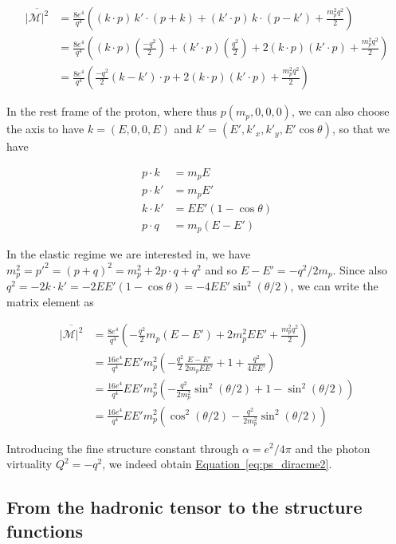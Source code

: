 \documentclass[a4paper,10pt]{report}
\newcommand{\eqlabel}{{Equation}}
\newcommand{\equref}[1]{\hyperref[#1]{\eqlabel~\ref*{#1}}}
\begin{document}
\begin{align}
  \overline{|\mathcal{M}|^2} &= \frac{8e^4}{q^4}\left((k\cdot p)\,k'\cdot(p+k) + (k'\cdot p)\,k\cdot (p-k') + \frac{m^2_p q^2}{2}\right) \nonumber \\
  &= \frac{8e^4}{q^4}\left( (k\cdot p)\left(\frac{-q^2}{2}\right) + (k'\cdot p)\left(\frac{q^2}{2}\right) + 2(k\cdot p)(k' \cdot p) + \frac{m^2_p q^2}{2}\right) \nonumber \\
  &= \frac{8e^4}{q^4}\left(\frac{-q^2}{2}(k-k')\cdot p + 2(k\cdot p)(k' \cdot p) + \frac{m^2_p q^2}{2}\right)
\end{align}

In the rest frame of the proton, where thus $p(m_p, 0, 0, 0)$, we can also choose the axis to have 
$k = (E, 0, 0, E)$ and $k' = (E', k'_x, k'_y, E'\cos\theta)$, so that we have

\begin{align}
  p\cdot k &= m_pE \\ 
  p\cdot k' &= m_pE' \\
  k\cdot k' &= EE'(1-\cos\theta) \\ 
  p\cdot q &= m_p(E-E')
\end{align}

In the elastic regime we are interested in, we have $m_p^2 = p'^2 = (p+q)^2 = m_p^2 + 2p\cdot q + q^2$ and so 
$E-E' = -q^2/2m_p$. Since also $q^2 = -2k\cdot k' = -2EE'(1-\cos\theta) = -4EE'\sin^2(\theta/2)$, we can write the 
matrix element as

\begin{align}
  \overline{|\mathcal{M}|^2} &= \frac{8e^4}{q^4}\left(- \frac{q^2}{2}m_p(E-E') + 2m_p^2EE' + \frac{m_p^2q^2}{2}\right) \nonumber \\
  &= \frac{16e^4}{q^4}EE'm_p^2\left(- \frac{q^2}{2}\frac{E-E'}{2m_p EE'} + 1 + \frac{q^2}{4EE'}\right) \nonumber \\
  &= \frac{16e^4}{q^4}EE'm_p^2\left(- \frac{q^2}{2m_p^2}\sin^2(\theta/2) + 1 - \sin^2(\theta/2)\right) \nonumber \\
  &= \frac{16e^4}{q^4}EE'm_p^2\left(\cos^2(\theta/2) - \frac{q^2}{2m_p^2}\sin^2(\theta/2)\right)
\end{align}

Introducing the fine structure constant through $\alpha = e^2/4\pi$ and the photon virtuality $Q^2 = -q^2$, we 
indeed obtain \equref{eq:ps_diracme2}.\\


\subsection{From the hadronic tensor to the structure functions}
\label{subsec:hadrotens}
\end{document}
